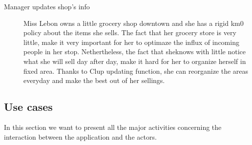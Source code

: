 \begin{description}
    \item[Manager updates shop's info]
    Miss Lebon owns a little grocery shop downtown and she has a rigid km0 policy about the items she sells. The fact that her grocery store is very little, make it very important for her to optimaze the influx of incoming people in her stop. Nethertheless, the fact that sheknows with little notice what she will sell day after day, make it hard for her to organize herself in fixed area. Thanks to Clup updating function, she can reorganize the areas everyday and make the best out of her sellings.
\end{description}


\subsection{Use cases}
\label{subsubsect:usecases} 

In this section we want to present all the major activities concerning the interaction between the application and the actors.

